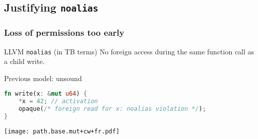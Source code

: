 \subsection{Justifying \texttt{noalias}}

\begin{frame}[fragile]
    \frametitle{Loss of permissions too early}
    \begin{alertblock}{LLVM \texttt{noalias} (in TB terms)}
        No foreign access during the same function call as a child write.
    \end{alertblock}
    \begin{block}{Previous model: unsound}
        \begin{lstlisting}[language=rust, escapechar=@]
fn write(x: &mut u64) {
    *x = 42; // activation
    opaque(/* foreign read for x: noalias violation */);
}
        \end{lstlisting}
    \end{block}
    \texttt{[image: path.base.mut+cw+fr.pdf]}
\end{frame}


